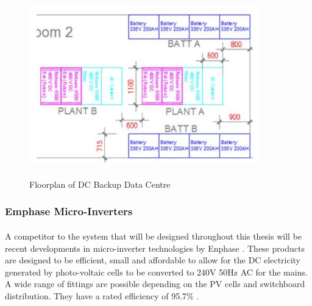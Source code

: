\begin{figure}[H]
\hfill\includegraphics[width = 100mm, height = 80mm]{images/DC_Centre}\hspace*{\fill}
\caption{{Floorplan of DC Backup Data Centre \cite{Lisy2015}}}
\label{fig:DC_Centre}
\end{figure} 

\subsubsection{Emphase Micro-Inverters}

\paragraph{}
A competitor to the system that will be designed throughout this thesis will be recent developments in micro-inverter technologies by Enphase \cite{website:Enphase}. These products are designed to be efficient, small and affordable to allow for the DC electricity generated by photo-voltaic cells to be converted to 240V 50Hz AC for the mains. A wide range of fittings are possible depending on the PV cells and switchboard distribution. They have a rated efficiency of 95.7\% \cite{website:Enphase}. 
 
\newpage